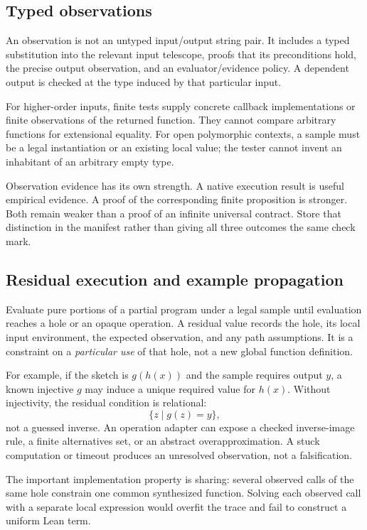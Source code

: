 \documentclass[11pt,a4paper]{article}
\theoremstyle{remark}
\begin{document}
\subsection{Typed observations}

An observation is not an untyped input/output string pair. It includes a typed substitution into the relevant input telescope, proofs that its preconditions hold, the precise output observation, and an evaluator/evidence policy. A dependent output is checked at the type induced by that particular input.

For higher-order inputs, finite tests supply concrete callback implementations or finite observations of the returned function. They cannot compare arbitrary functions for extensional equality. For open polymorphic contexts, a sample must be a legal instantiation or an existing local value; the tester cannot invent an inhabitant of an arbitrary empty type.

Observation evidence has its own strength. A native execution result is useful empirical evidence. A proof of the corresponding finite proposition is stronger. Both remain weaker than a proof of an infinite universal contract. Store that distinction in the manifest rather than giving all three outcomes the same check mark.

\subsection{Residual execution and example propagation}

Evaluate pure portions of a partial program under a legal sample until evaluation reaches a hole or an opaque operation. A residual value records the hole, its local input environment, the expected observation, and any path assumptions. It is a constraint on a \emph{particular use} of that hole, not a new global function definition.

For example, if the sketch is $g(h(x))$ and the sample requires output $y$, a known injective $g$ may induce a unique required value for $h(x)$. Without injectivity, the residual condition is relational:
\[
 \{z\mid g(z)=y\},
\]
not a guessed inverse. An operation adapter can expose a checked inverse-image rule, a finite alternatives set, or an abstract overapproximation. A stuck computation or timeout produces an unresolved observation, not a falsification.

The important implementation property is sharing: several observed calls of the same hole constrain one common synthesized function. Solving each observed call with a separate local expression would overfit the trace and fail to construct a uniform Lean term.
\end{document}
